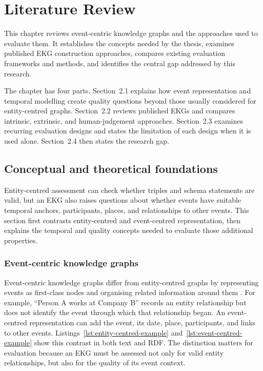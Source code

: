 \chapter{Literature Review}


This chapter reviews event-centric knowledge graphs and the approaches used to evaluate them. It establishes the concepts needed by the thesis, examines published EKG construction approaches, compares existing evaluation frameworks and methods, and identifies the central gap addressed by this research.

The chapter has four parts. Section~2.1 explains how event representation and temporal modelling create quality questions beyond those usually considered for entity-centred graphs. Section~2.2 reviews published EKGs and compares intrinsic, extrinsic, and human-judgement approaches. Section~2.3 examines recurring evaluation designs and states the limitation of each design when it is used alone. Section~2.4 then states the research gap.

\section{Conceptual and theoretical foundations}

Entity-centred assessment can check whether triples and schema statements are valid, but an EKG also raises questions about whether events have suitable temporal anchors, participants, places, and relationships to other events. This section first contrasts entity-centred and event-centred representation, then explains the temporal and quality concepts needed to evaluate those additional properties.

\subsection{Event-centric knowledge graphs}

Event-centric knowledge graphs differ from entity-centred graphs by representing events as first-class nodes and organising related information around them \citep{sem2011}. For example, ``Person A works at Company B'' records an entity relationship but does not identify the event through which that relationship began. An event-centred representation can add the event, its date, place, participants, and links to other events. Listings~\ref{lst:entity-centred-example} and~\ref{lst:event-centred-example} show this contrast in both text and RDF. The distinction matters for evaluation because an EKG must be assessed not only for valid entity relationships, but also for the quality of its event context.

